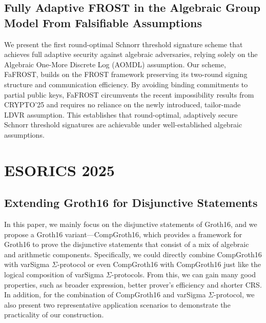 \documentclass[11pt,oneside]{book}
\theoremstyle{definition}
\theoremstyle{remark}
\theoremstyle{plain}
\begin{document}
 \section{\cite{cryptoeprint:2025/1950} Fully Adaptive FROST in the Algebraic Group Model From Falsifiable Assumptions }
 We present the first round-optimal Schnorr threshold signature scheme that achieves full adaptive security against algebraic adversaries, relying solely on the Algebraic One-More Discrete Log (AOMDL) assumption.
Our scheme, FaFROST, builds on the FROST framework preserving its two-round signing structure and communication efficiency.
By avoiding binding commitments to partial public keys, FaFROST circumvents the recent impossibility results from CRYPTO’25 and requires no reliance on the newly introduced, tailor-made LDVR assumption.
This establishes that round-optimal, adaptively secure Schnorr threshold signatures are achievable under well-established algebraic assumptions.



\chapter{ESORICS 2025}
\section{\cite{10.1007/978-3-032-07891-9_26} Extending Groth16 for Disjunctive Statements}
In this paper, we mainly focus on the disjunctive statements of Groth16, and we propose a Groth16 variant---CompGroth16, which provides a framework for Groth16 to prove the disjunctive statements that consist of a mix of algebraic and arithmetic components. Specifically, we could directly combine CompGroth16 with varSigma $\Sigma$-protocol or even CompGroth16 with CompGroth16 just like the logical composition of varSigma $\Sigma$-protocols. From this, we can gain many good properties, such as broader expression, better prover's efficiency and shorter CRS. In addition, for the combination of CompGroth16 and varSigma $\Sigma$-protocol, we also present two representative application scenarios to demonstrate the practicality of our construction.
\end{document}
